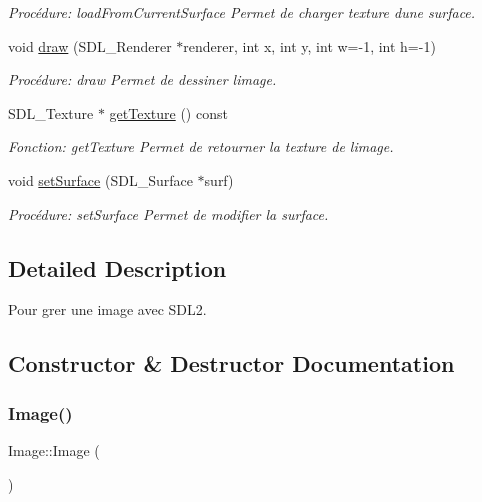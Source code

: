 \begin{DoxyCompactItemize}
\begin{DoxyCompactList}\small\item\em Procédure\+: load\+From\+Current\+Surface Permet de charger texture d\textquotesingle{}une surface. \end{DoxyCompactList}\item 
void \hyperlink{classImage_a82d6936d466ba0161d8b9cbacf613de5}{draw} (S\+D\+L\+\_\+\+Renderer $\ast$renderer, int x, int y, int w=-\/1, int h=-\/1)
\begin{DoxyCompactList}\small\item\em Procédure\+: draw Permet de dessiner l\textquotesingle{}image. \end{DoxyCompactList}\item 
S\+D\+L\+\_\+\+Texture $\ast$ \hyperlink{classImage_ae9e27e310b4322d04366f2882f3a4242}{get\+Texture} () const
\begin{DoxyCompactList}\small\item\em Fonction\+: get\+Texture Permet de retourner la texture de l\textquotesingle{}image. \end{DoxyCompactList}\item 
void \hyperlink{classImage_a833f5d3b4b9f905320c6dffcc9b84b95}{set\+Surface} (S\+D\+L\+\_\+\+Surface $\ast$surf)
\begin{DoxyCompactList}\small\item\em Procédure\+: set\+Surface Permet de modifier la surface. \end{DoxyCompactList}\end{DoxyCompactItemize}


\subsection{Detailed Description}
Pour grer une image avec S\+D\+L2. 

\subsection{Constructor \& Destructor Documentation}
\mbox{\label{classImage_a58edd1c45b4faeb5f789b0d036d02313}} 
\subsubsection{\texorpdfstring{Image()}{Image()}\hspace{0.1cm}{\footnotesize\ttfamily [1/4]}}
{\footnotesize\ttfamily Image\+::\+Image (\begin{DoxyParamCaption}{ }\end{DoxyParamCaption})}



